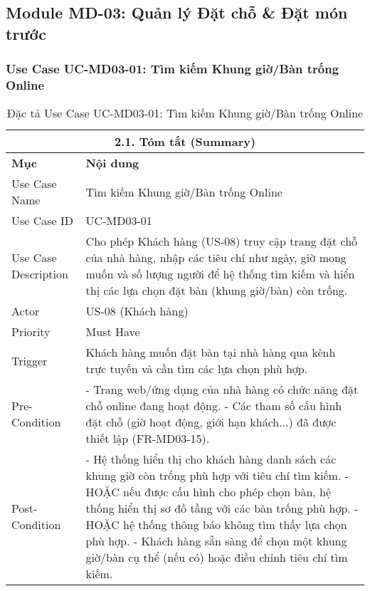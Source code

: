 \subsection{Module MD-03: Quản lý Đặt chỗ \& Đặt món trước}

\subsubsection{Use Case UC-MD03-01: Tìm kiếm Khung giờ/Bàn trống Online}

\begin{longtable}{|m{4cm}|p{11cm}|}
\caption{Đặc tả Use Case UC-MD03-01: Tìm kiếm Khung giờ/Bàn trống Online} \label{tab:uc_md03_01_revised_v3} \\
\hline
\multicolumn{2}{|c|}{\textbf{2.1. Tóm tắt (Summary)}} \\
\hline
\textbf{Mục} & \textbf{Nội dung} \\
\hline
\endhead %
\hline
\endfoot %
\hline
\endlastfoot %
Use Case Name & Tìm kiếm Khung giờ/Bàn trống Online \\
\hline
Use Case ID & UC-MD03-01 \\
\hline
Use Case Description & Cho phép Khách hàng (US-08) truy cập trang đặt chỗ của nhà hàng, nhập các tiêu chí như ngày, giờ mong muốn và số lượng người để hệ thống tìm kiếm và hiển thị các lựa chọn đặt bàn (khung giờ/bàn) còn trống. \\
\hline
Actor & US-08 (Khách hàng) \\
\hline
Priority & Must Have \\
\hline
Trigger & Khách hàng muốn đặt bàn tại nhà hàng qua kênh trực tuyến và cần tìm các lựa chọn phù hợp. \\
\hline
Pre-Condition & - Trang web/ứng dụng của nhà hàng có chức năng đặt chỗ online đang hoạt động. \newline - Các tham số cấu hình đặt chỗ (giờ hoạt động, giới hạn khách...) đã được thiết lập (FR-MD03-15). \\
\hline
Post-Condition & - Hệ thống hiển thị cho khách hàng danh sách các khung giờ còn trống phù hợp với tiêu chí tìm kiếm. \newline - HOẶC nếu được cấu hình cho phép chọn bàn, hệ thống hiển thị sơ đồ tầng với các bàn trống phù hợp. \newline - HOẶC hệ thống thông báo không tìm thấy lựa chọn phù hợp. \newline - Khách hàng sẵn sàng để chọn một khung giờ/bàn cụ thể (nếu có) hoặc điều chỉnh tiêu chí tìm kiếm. \\

\end{longtable}
